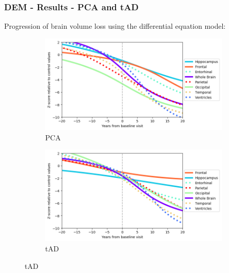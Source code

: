 \documentclass[10pt,xcolor=table]{beamer}
\begin{document}
\begin{frame}
\frametitle{DEM - Results - PCA and tAD}


Progression of brain volume loss using the differential equation model:

\begin{figure}
\hspace{-0.5em}
\begin{subfigure}{0.47\textwidth}
 \centering
 \includegraphics[scale=0.3]{../images/dem/mriSmallSebPaper_DEMStdPCA_trajAlign.png}
 \caption{PCA}
 \label{fig:trajDEMPCA}
\end{subfigure}
\hspace{1em}
\begin{subfigure}{0.47\textwidth}
 \centering
 \includegraphics[scale=0.3]{../images/dem/mriSmallSebPaper_DEMStdAD_trajAlign.png}
 \caption{tAD}
  \label{fig:trajDEMAD}
\end{subfigure}
\end{figure}

\end{frame}
\end{document}
